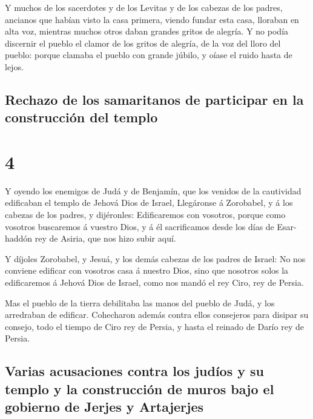 Y muchos de los sacerdotes y de los Levitas y de los
cabezas de los padres, ancianos que habían visto la casa primera, viendo
fundar esta casa, lloraban en alta voz, mientras muchos otros daban
grandes gritos de alegría.  Y no podía discernir el
pueblo el clamor de los gritos de alegría, de la voz del lloro del
pueblo: porque clamaba el pueblo con grande júbilo, y oíase el ruido
hasta de lejos.

\hypertarget{rechazo-de-los-samaritanos-de-participar-en-la-construcciuxf3n-del-templo}{%
\subsection{Rechazo de los samaritanos de participar en la construcción
del
templo}\label{rechazo-de-los-samaritanos-de-participar-en-la-construcciuxf3n-del-templo}}

\hypertarget{section-3}{%
\section{4}\label{section-3}}

 Y oyendo los enemigos de Judá y de Benjamín, que los
venidos de la cautividad edificaban el templo de Jehová Dios de Israel,
 Llegáronse á Zorobabel, y á los cabezas de los padres, y
dijéronles: Edificaremos con vosotros, porque como vosotros buscaremos á
vuestro Dios, y á él sacrificamos desde los días de Esar-haddón rey de
Asiria, que nos hizo subir aquí.

 Y díjoles Zorobabel, y Jesuá, y los demás cabezas de los
padres de Israel: No nos conviene edificar con vosotros casa á nuestro
Dios, sino que nosotros solos la edificaremos á Jehová Dios de Israel,
como nos mandó el rey Ciro, rey de Persia.

 Mas el pueblo de la tierra debilitaba las manos del
pueblo de Judá, y los arredraban de edificar.  Cohecharon
además contra ellos consejeros para disipar su consejo, todo el tiempo
de Ciro rey de Persia, y hasta el reinado de Darío rey de Persia.

\hypertarget{varias-acusaciones-contra-los-juduxedos-y-su-templo-y-la-construcciuxf3n-de-muros-bajo-el-gobierno-de-jerjes-y-artajerjes}{%
\subsection{Varias acusaciones contra los judíos y su templo y la
construcción de muros bajo el gobierno de Jerjes y
Artajerjes}\label{varias-acusaciones-contra-los-juduxedos-y-su-templo-y-la-construcciuxf3n-de-muros-bajo-el-gobierno-de-jerjes-y-artajerjes}}

